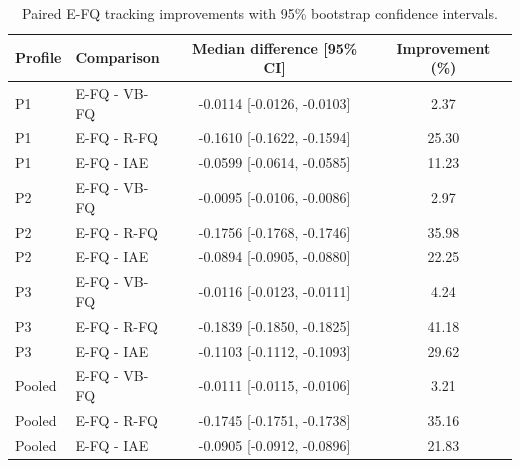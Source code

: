 \begin{table}[t]
\centering
\caption{Paired E-FQ tracking improvements with 95\% bootstrap confidence intervals.}
\label{tab:rmq_improvement}
\begin{tabular}{llcc}
\toprule
Profile & Comparison & Median difference [95\% CI] & Improvement (\%) \\
\midrule
P1 & E-FQ - VB-FQ & -0.0114 [-0.0126, -0.0103] & 2.37 \\
P1 & E-FQ - R-FQ & -0.1610 [-0.1622, -0.1594] & 25.30 \\
P1 & E-FQ - IAE & -0.0599 [-0.0614, -0.0585] & 11.23 \\
P2 & E-FQ - VB-FQ & -0.0095 [-0.0106, -0.0086] & 2.97 \\
P2 & E-FQ - R-FQ & -0.1756 [-0.1768, -0.1746] & 35.98 \\
P2 & E-FQ - IAE & -0.0894 [-0.0905, -0.0880] & 22.25 \\
P3 & E-FQ - VB-FQ & -0.0116 [-0.0123, -0.0111] & 4.24 \\
P3 & E-FQ - R-FQ & -0.1839 [-0.1850, -0.1825] & 41.18 \\
P3 & E-FQ - IAE & -0.1103 [-0.1112, -0.1093] & 29.62 \\
Pooled & E-FQ - VB-FQ & -0.0111 [-0.0115, -0.0106] & 3.21 \\
Pooled & E-FQ - R-FQ & -0.1745 [-0.1751, -0.1738] & 35.16 \\
Pooled & E-FQ - IAE & -0.0905 [-0.0912, -0.0896] & 21.83 \\
\bottomrule
\end{tabular}
\end{table}
